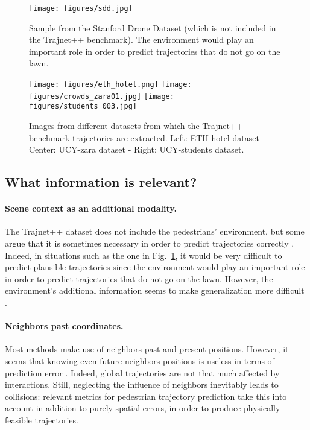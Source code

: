 \documentclass[conference]{IEEEtran}
\begin{document}
\begin{figure}[t]
\centerline{\texttt{[image: figures/sdd.jpg]}}
\caption{Sample from the Stanford Drone Dataset (which is not included in the Trajnet++ benchmark). The environment would play an important role in order to predict trajectories that do not go on the lawn.}
\label{stanford}
\end{figure}

\begin{figure*}[ht]
\centerline{\texttt{[image: figures/eth\_hotel.png]}\hfill
\texttt{[image: figures/crowds\_zara01.jpg]}\hfill
\texttt{[image: figures/students\_003.jpg]}}
\caption{Images from different datasets from which the Trajnet++ benchmark trajectories are extracted. Left: ETH-hotel dataset - Center: UCY-zara dataset - Right: UCY-students dataset.}
\label{datasets}
\end{figure*}

\subsection{What information is relevant?} 

\paragraph{Scene context as an additional modality.} The Trajnet++ dataset does not include the pedestrians' environment, but some argue that it is sometimes necessary in order to predict trajectories correctly \cite{leal-taixe_red_2019}. Indeed, in situations such as the one in Fig.~\ref{stanford}, it would be very difficult to predict plausible trajectories since the environment would play an important role in order to predict trajectories that do not go on the lawn. However, the environment's additional information seems to make generalization more difficult \cite{scholler_what_2020}.

\paragraph{Neighbors past coordinates.}  Most methods make use of neighbors past and present positions. However, it seems that knowing even future neighbors positions is useless in terms of prediction error \cite{scholler_what_2020}. Indeed, global trajectories are not that much affected by interactions. Still, neglecting the influence of neighbors inevitably leads to collisions: relevant metrics for pedestrian trajectory prediction take this into account in addition to purely spatial errors, in order to produce physically feasible trajectories.
\end{document}

